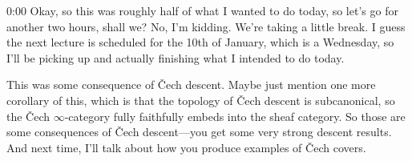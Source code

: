 \begin{unfinished}{0:00}
Okay, so this was roughly half of what I wanted to do today, so let's go for another two hours, shall we? No, I'm kidding. We're taking a little break. I guess the next lecture is scheduled for the 10th of January, which is a Wednesday, so I'll be picking up and actually finishing what I intended to do today.

This was some consequence of \v Cech descent. Maybe just mention one more corollary of this, which is that the topology of \v Cech descent is subcanonical, so the \v Cech $\infty$-category fully faithfully embeds into the sheaf category. So those are some consequences of \v Cech descent---you get some very strong descent results. And next time, I'll talk about how you produce examples of \v Cech covers.


\end{unfinished}